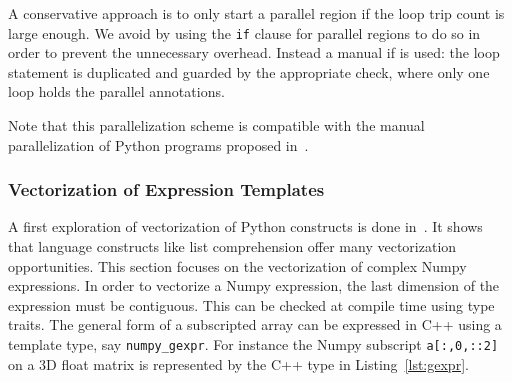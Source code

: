 \documentclass[10pt, preprint]{sigplanconf}
\begin{document}
%
%

A conservative approach is to only start a parallel region if the loop trip
count is large enough. We avoid by using the \texttt{if} clause for parallel
regions to do so in order to prevent the unnecessary overhead. Instead a manual
if is used: the loop statement is duplicated and guarded by the appropriate
check, where only one loop holds the parallel annotations.

Note that this parallelization scheme is compatible with the manual
parallelization of Python programs proposed in~\cite{pyhpc2013}.

\subsubsection{Vectorization of Expression Templates}

A first exploration of vectorization of Python constructs is done
in~\cite{wpmvp2014}. It shows that language constructs like list comprehension
offer many vectorization opportunities. This section focuses on the
vectorization of complex Numpy expressions. In order to vectorize a Numpy
expression, the last dimension of the expression must be contiguous. This can
be checked at compile time using type traits. The general form of a subscripted
array can be expressed in C++ using a template type, say \texttt{numpy\_gexpr}.
For instance the Numpy subscript \lstinline|a[:,0,::2]| on a 3D float matrix is
represented by the C++ type in Listing~\ref{lst:gexpr}.
\end{document}
